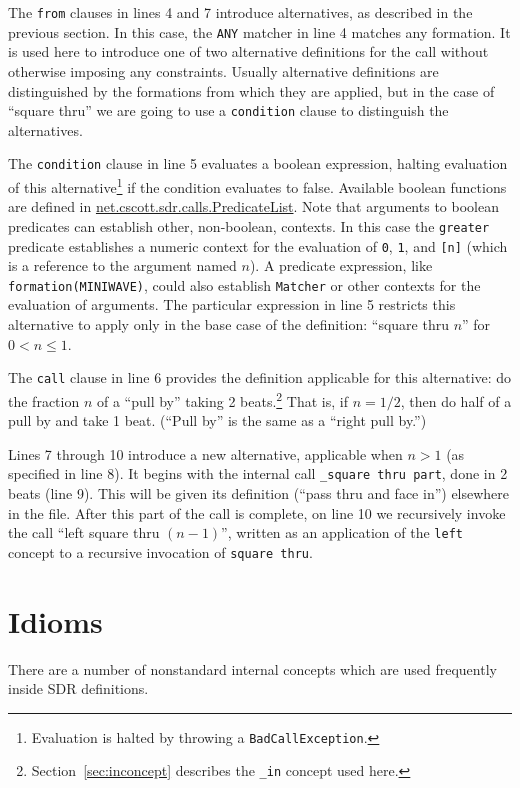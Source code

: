 \documentclass[12pt]{article}
\newcommand{\clause}[1]{\texttt{#1}}
\renewcommand{\call}[1]{\texttt{#1}} %
\newcommand{\package}[1]{\url{#1}}
\begin{document}
The \clause{from} clauses in lines 4 and 7 introduce alternatives, as
described in the previous section.  In this case, the \texttt{ANY}
matcher in line 4 matches any formation.  It is used here to introduce
one of two alternative definitions for the call without otherwise
imposing any constraints.  Usually alternative definitions are
distinguished by the formations from which they are applied, but in
the case of ``square thru'' we are going to use a \clause{condition}
clause to distinguish the alternatives.

The \clause{condition} clause in line 5 evaluates a boolean
expression, halting evaluation of this alternative\footnote{Evaluation
  is halted by throwing a \texttt{BadCallException}.} if the condition
evaluates to false.  Available boolean functions are defined in
\package{net.cscott.sdr.calls.PredicateList}.  Note that arguments to
boolean predicates can establish other, non-boolean, contexts.  In
this case the \call{greater} predicate establishes a numeric context
for the evaluation of \texttt{0}, \texttt{1}, and \texttt{[n]} (which
is a reference to the argument named $n$).  A predicate expression,
like \texttt{formation(MINIWAVE)}, could also establish
\texttt{Matcher} or other contexts for the evaluation of arguments.
The particular expression in line 5 restricts this alternative to
apply only in the base case of the definition: ``square thru $n$'' for
$0 < n \leq 1$.

The \clause{call} clause in line 6 provides the definition
applicable for this alternative: do the fraction $n$ of a
``pull by'' taking 2 beats.\footnote{Section~\ref{sec:inconcept}
  describes the \call{_in} concept used here.}
That is, if $n=1/2$, then do half of a
pull by and take 1 beat.  (``Pull by'' is the same as a ``right pull by.'')

Lines 7 through 10 introduce a new alternative, applicable when $n>1$
(as specified in line 8).
It begins with the internal call \call{\_square thru part}, done in 2
beats (line 9).  This will be given its definition (``pass thru and face in'')
elsewhere in the file.  After this part of the call is complete, on
line 10 we recursively
invoke the call ``left square thru $(n-1)$'', written as an application
of the \call{left} concept to a recursive invocation of \call{square thru}.

\section{Idioms}
There are a number of nonstandard internal concepts which are used
frequently inside SDR definitions.
\end{document}
